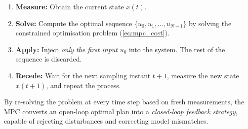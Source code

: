 \begin{enumerate}
	\item \textbf{Measure:} Obtain the current state $x(t)$.
	\item \textbf{Solve:} Compute the optimal sequence $\{u_0, u_1, \dots, u_{N-1}\}$ by solving the constrained optimisation problem (\ref{eq:mpc_cost}).
	\item \textbf{Apply:} Inject \emph{only the first input} $u_0$ into the system. The rest of the sequence is discarded.
	\item \textbf{Recede:} Wait for the next sampling instant $t+1$, measure the new state $x(t+1)$, and repeat the process.
\end{enumerate}

By re-solving the problem at every time step based on fresh measurements, the MPC converts an open-loop optimal plan into a \emph{closed-loop feedback strategy}, capable of rejecting disturbances and correcting model mismatches.

